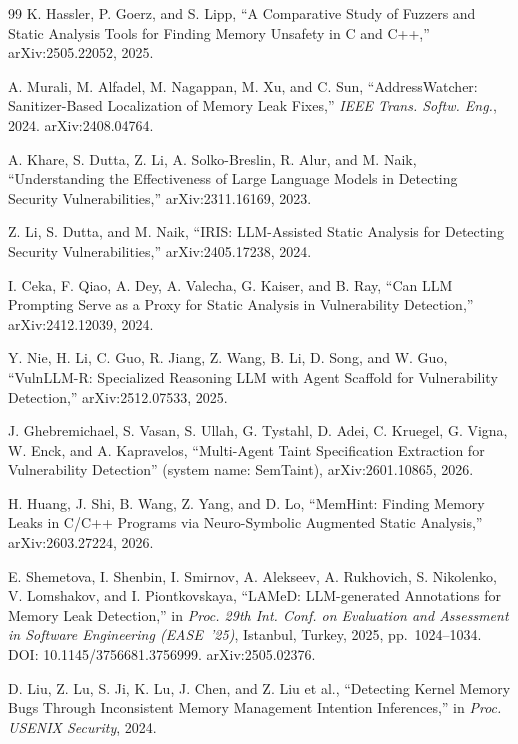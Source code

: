 \documentclass[11pt,a4paper]{article}
\begin{document}
\begin{thebibliography}{99}
 K. Hassler, P. Goerz, and S. Lipp, ``A Comparative Study of Fuzzers and Static Analysis Tools for Finding Memory Unsafety in C and C++,'' arXiv:2505.22052, 2025.

 A. Murali, M. Alfadel, M. Nagappan, M. Xu, and C. Sun, ``AddressWatcher: Sanitizer-Based Localization of Memory Leak Fixes,'' \textit{IEEE Trans. Softw. Eng.}, 2024. arXiv:2408.04764.

 A. Khare, S. Dutta, Z. Li, A. Solko-Breslin, R. Alur, and M. Naik, ``Understanding the Effectiveness of Large Language Models in Detecting Security Vulnerabilities,'' arXiv:2311.16169, 2023.

 Z. Li, S. Dutta, and M. Naik, ``IRIS: LLM-Assisted Static Analysis for Detecting Security Vulnerabilities,'' arXiv:2405.17238, 2024.

 I. Ceka, F. Qiao, A. Dey, A. Valecha, G. Kaiser, and B. Ray, ``Can LLM Prompting Serve as a Proxy for Static Analysis in Vulnerability Detection,'' arXiv:2412.12039, 2024.

 Y. Nie, H. Li, C. Guo, R. Jiang, Z. Wang, B. Li, D. Song, and W. Guo, ``VulnLLM-R: Specialized Reasoning LLM with Agent Scaffold for Vulnerability Detection,'' arXiv:2512.07533, 2025.

 J. Ghebremichael, S. Vasan, S. Ullah, G. Tystahl, D. Adei, C. Kruegel, G. Vigna, W. Enck, and A. Kapravelos, ``Multi-Agent Taint Specification Extraction for Vulnerability Detection'' (system name: SemTaint), arXiv:2601.10865, 2026.

 H. Huang, J. Shi, B. Wang, Z. Yang, and D. Lo, ``MemHint: Finding Memory Leaks in C/C++ Programs via Neuro-Symbolic Augmented Static Analysis,'' arXiv:2603.27224, 2026.

 E. Shemetova, I. Shenbin, I. Smirnov, A. Alekseev, A. Rukhovich, S. Nikolenko, V. Lomshakov, and I. Piontkovskaya, ``LAMeD: LLM-generated Annotations for Memory Leak Detection,'' in \textit{Proc. 29th Int. Conf. on Evaluation and Assessment in Software Engineering (EASE~'25)}, Istanbul, Turkey, 2025, pp.~1024--1034. DOI: 10.1145/3756681.3756999. arXiv:2505.02376.

 D. Liu, Z. Lu, S. Ji, K. Lu, J. Chen, and Z. Liu et al., ``Detecting Kernel Memory Bugs Through Inconsistent Memory Management Intention Inferences,'' in \textit{Proc. USENIX Security}, 2024.


\end{thebibliography}
\end{document}

